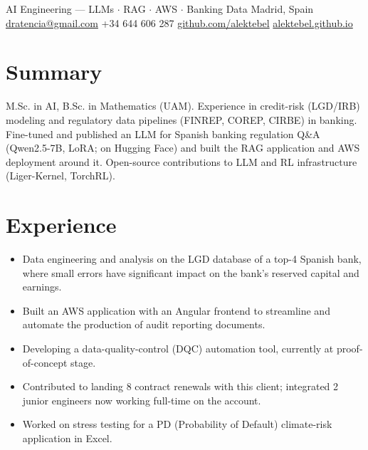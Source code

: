 \documentclass[10pt,a4paper]{article}
\begin{document}
  {AI Engineering --- LLMs \(\cdot\) RAG \(\cdot\) AWS \(\cdot\) Banking Data}
  {Madrid, Spain \;\textbullet\; \href{mailto:dratencia@gmail.com}{dratencia@gmail.com} \;\textbullet\; +34 644 606 287}
  {\href{https://github.com/alektebel}{github.com/alektebel} \;\textbullet\; \href{https://alektebel.github.io}{alektebel.github.io}}

\section{Summary}
M.Sc. in AI, B.Sc. in Mathematics (UAM). Experience in credit-risk (LGD/IRB)
modeling and regulatory data pipelines (FINREP, COREP, CIRBE) in banking.
Fine-tuned and published an LLM for Spanish banking regulation Q\&A
(Qwen2.5-7B, LoRA; on Hugging Face) and built the RAG application and AWS
deployment around it. Open-source
contributions to LLM and RL infrastructure (Liger-Kernel, TorchRL).

\section{Experience}

\begin{itemize}
  \item Data engineering and analysis on the LGD database of a top-4 Spanish bank, where small errors have significant impact on the bank's reserved capital and earnings.
  \item Built an AWS application with an Angular frontend to streamline and automate the production of audit reporting documents.
  \item Developing a data-quality-control (DQC) automation tool, currently at proof-of-concept stage.
  \item Contributed to landing 8 contract renewals with this client; integrated 2 junior engineers now working full-time on the account.
\end{itemize}

\vspace{4pt}
\begin{itemize}
  \item Worked on stress testing for a PD (Probability of Default) climate-risk application in Excel.
\end{itemize}
\end{document}
